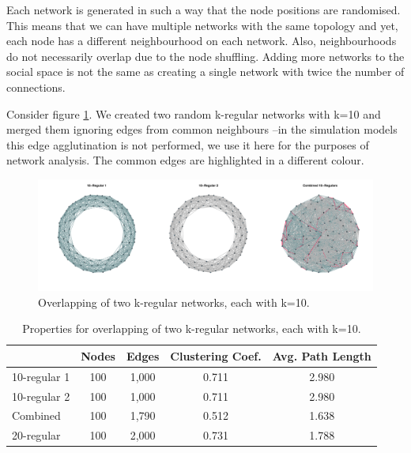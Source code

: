 \documentclass[preprint,number]{elsarticle}
\begin{document}
Each network is generated in such a way that the node positions are randomised. This means that we can have multiple networks with the same topology and yet, each node has a different neighbourhood on each network. Also, neighbourhoods do not necessarily overlap due to the node shuffling. Adding more networks to the social space is not the same as creating a single network with twice the number of connections. 

\noindent Consider figure \ref{fig:network_properties_merge_2_10regular}. We created two random k-regular networks with k=10 and merged them ignoring edges from common neighbours --in the simulation models this edge agglutination is not performed, we use it here for the purposes of network analysis. The common edges are highlighted in a different colour.

\begin{figure}
	\centering
	\includegraphics[width=1\linewidth]{"../analysis/pdf/network_properties_merge_2_10regular"}
	\begin{minipage}{0.9\textwidth}
		\caption{Overlapping of two k-regular networks, each with k=10.}
		\label{fig:network_properties_merge_2_10regular}
	\end{minipage}
\end{figure}

\begin{table}
	\centering
	\begin{minipage}{0.9\textwidth}
		\caption{Properties for overlapping of two k-regular networks, each with k=10.}
		\label{tab:network_properties_merge_2_10regular}
	\end{minipage}
	\begin{tabular}{lcccc}
		& Nodes &  Edges & Clustering Coef.	  &  Avg. Path Length \\ 
		\hline  10-regular 1 & 100 &  1,000  &  0.711 &  2.980 \\ 
		\hline  10-regular 2 & 100 & 1,000 & 0.711 &  2.980 \\ 
		\hline  Combined & 100 & 1,790  & 0.512 &  1.638 \\ 
		\hline 20-regular & 100 & 2,000	& 0.731	& 1.788 \\
		\hline 
	\end{tabular} 
\end{table}
\end{document}
